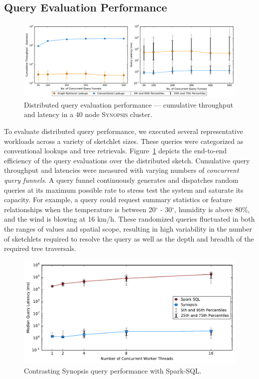 \subsection{Query Evaluation Performance}
\begin{figure}
    \centerline{\includegraphics[width=\linewidth]{figures/query_benchmark_both.pdf}}
    \caption{Distributed query evaluation performance --- cumulative throughput and latency in a 40 node \textsc{Synopsis} cluster.}
    \label{fig:dist-query}
\end{figure}
To evaluate distributed query performance, we executed several representative workloads across a variety of sketchlet sizes. These queries were categorized as conventional lookups and tree retrievals.  Figure~\ref{fig:dist-query} depicts the end-to-end efficiency of the query evaluations over the distributed sketch.
Cumulative query throughput and latencies were measured with varying numbers of \emph{concurrent query funnels}.
A query funnel continuously generates and dispatches random queries at its maximum possible rate to stress test the system and saturate its capacity. For example, a query could request summary statistics or feature relationships when the temperature is between 20$^{\circ}$ - 30$^{\circ}$, humidity is above 80\%, and the wind is blowing at 16 km/h.
These randomized queries fluctuated in both the ranges of values and spatial scope, resulting in high variability in the number of sketchlets required to resolve the query as well as the depth and breadth of the required tree traversals.
%
\begin{figure}
    \centerline{\includegraphics[width=\linewidth]{figures/spark-sql-query-complete.pdf}}
    \caption{Contrasting Synopsis query performance with Spark-SQL.}
    \label{fig:spark-sql-query}
\end{figure}
